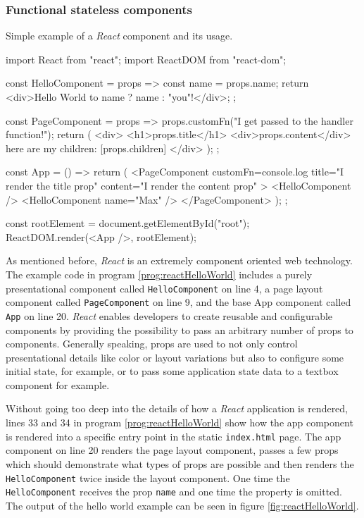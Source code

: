 \subsubsection{Functional stateless components}

\begin{program}
\caption{Simple example of a \emph{React} component and its usage.} 
\label{prog:reactHelloWorld}
\begin{JsCode}
import React from "react";
import ReactDOM from "react-dom";

const HelloComponent = props => {
  const name = props.name;
  return <div>Hello World to {name ? name : "you"}!</div>;
};

const PageComponent = props => {
  props.customFn("I get passed to the handler function!");
  return (
    <div>
      <h1>{props.title}</h1>
      <div>{props.content}</div>
      here are my children: [{props.children}]
    </div>
  );
};

const App = () => {
  return (
    <PageComponent
      customFn={console.log}
      title="I render the title prop"
      content="I render the content prop"
    >
      <HelloComponent />
      <HelloComponent name={"Max"} />
    </PageComponent>
  );
};

const rootElement = document.getElementById("root");
ReactDOM.render(<App />, rootElement);  
\end{JsCode}
\end{program}

As mentioned before, \emph{React} is an extremely component oriented web technology. The example code in program \ref{prog:reactHelloWorld} includes a purely presentational component called \texttt{Hello\-Component} on line 4, a page layout component called \texttt{PageComponent} on line 9, and the base App component called \texttt{App} on line 20. \emph{React} enables developers to create reusable and configurable components by providing the possibility to pass an arbitrary number of props to components. Generally speaking, props are used to not only control presentational details like color or layout variations but also to configure some initial state, for example, or to pass some application state data to a textbox component for example.

Without going too deep into the details of how a \emph{React} application is rendered, lines 33 and 34 in program \ref{prog:reactHelloWorld} show how the app component is rendered into a specific entry point in the static \texttt{index.html} page. The app component on line 20 renders the page layout component, passes a few props which should demonstrate what types of props are possible and then renders the \texttt{HelloComponent} twice inside the layout component. One time the \texttt{HelloComponent} receives the prop \texttt{name} and one time the property is omitted. The output of the hello world example can be seen in figure \ref{fig:reactHelloWorld}. 

